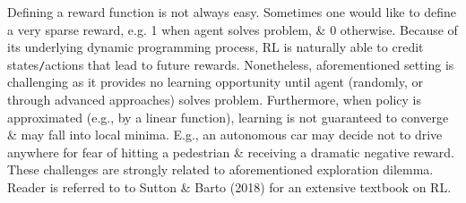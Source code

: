 \documentclass{article}
\begin{document}
\begin{itemize}
\begin{itemize}
\begin{itemize}
            Defining a reward function is not always easy. Sometimes one would like to define a very sparse reward, e.g. 1 when agent solves problem, \& 0 otherwise. Because of its underlying dynamic programming process, RL is naturally able to credit states{\tt/}actions that lead to future rewards. Nonetheless, aforementioned setting is challenging as it provides no learning opportunity until agent (randomly, or through advanced approaches) solves problem. Furthermore, when policy is approximated (e.g., by a linear function), learning is not guaranteed to converge \& may fall into local minima. E.g., an autonomous car may decide not to drive anywhere for fear of hitting a pedestrian \& receiving a dramatic negative reward. These challenges are strongly related to aforementioned exploration dilemma. Reader is referred to to Sutton \& Barto (2018) for an extensive textbook on RL.


\end{itemize}
\end{itemize}
\end{itemize}
\end{document}
